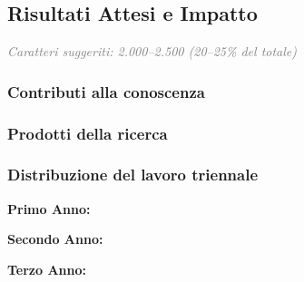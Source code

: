 \documentclass{gs-adonis}
\begin{document}


\subsection{Risultati Attesi e Impatto}
{\small\textcolor{gray}{\textit{Caratteri suggeriti: 2.000--2.500 (20--25\% del totale)}}}


\subsubsection{Contributi alla conoscenza}

\subsubsection{Prodotti della ricerca}

\subsubsection{Distribuzione del lavoro triennale}
\textbf{Primo Anno:}

\textbf{Secondo Anno:}

\textbf{Terzo Anno:}

\end{document}
